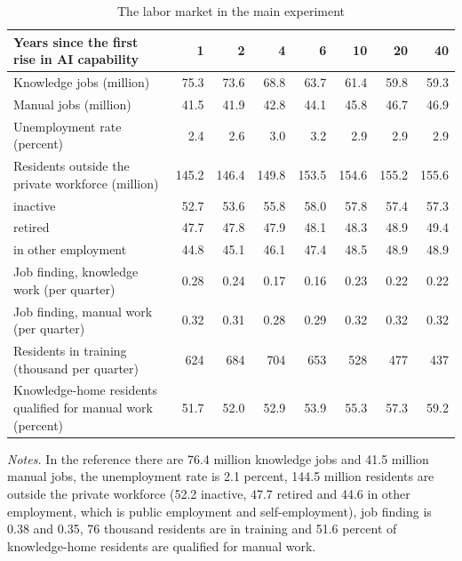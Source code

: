 \begin{table}[htbp]\centering\small
\caption{The labor market in the main experiment}\label{tab:labor}
\begin{tabularx}{\linewidth}{@{}>{\raggedright\arraybackslash}Xrrrrrrr@{}}\toprule
Years since the first rise in AI capability & 1 & 2 & 4 & 6 & 10 & 20 & 40 \\\midrule
Knowledge jobs (million) & 75.3 & 73.6 & 68.8 & 63.7 & 61.4 & 59.8 & 59.3 \\
Manual jobs (million) & 41.5 & 41.9 & 42.8 & 44.1 & 45.8 & 46.7 & 46.9 \\
Unemployment rate (percent) & 2.4 & 2.6 & 3.0 & 3.2 & 2.9 & 2.9 & 2.9 \\
Residents outside the private workforce (million) & 145.2 & 146.4 & 149.8 & 153.5 & 154.6 & 155.2 & 155.6 \\
\quad inactive & 52.7 & 53.6 & 55.8 & 58.0 & 57.8 & 57.4 & 57.3 \\
\quad retired & 47.7 & 47.8 & 47.9 & 48.1 & 48.3 & 48.9 & 49.4 \\
\quad in other employment & 44.8 & 45.1 & 46.1 & 47.4 & 48.5 & 48.9 & 48.9 \\
Job finding, knowledge work (per quarter) & 0.28 & 0.24 & 0.17 & 0.16 & 0.23 & 0.22 & 0.22 \\
Job finding, manual work (per quarter) & 0.32 & 0.31 & 0.28 & 0.29 & 0.32 & 0.32 & 0.32 \\
Residents in training (thousand per quarter) & 624 & 684 & 704 & 653 & 528 & 477 & 437 \\
Knowledge-home residents qualified for manual work (percent) & 51.7 & 52.0 & 52.9 & 53.9 & 55.3 & 57.3 & 59.2 \\
\bottomrule\end{tabularx}
\par\smallskip\begin{minipage}{\linewidth}\footnotesize\emph{Notes.} In the reference there are 76.4 million knowledge jobs and 41.5 million manual jobs, the unemployment rate is 2.1 percent, 144.5 million residents are outside the private workforce (52.2 inactive, 47.7 retired and 44.6 in other employment, which is public employment and self-employment), job finding is 0.38 and 0.35, 76 thousand residents are in training and 51.6 percent of knowledge-home residents are qualified for manual work.\end{minipage}
\end{table}
